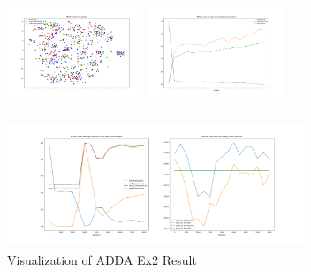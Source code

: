 \documentclass[conference]{IEEEtran}
\begin{document}
\begin{figure}[htb]

\centering
\begin{minipage}[t]{0.26\textwidth}
\includegraphics[width=1.6in, height=1.5in]{Ladda/A2R_no_dec_no_bn/ADDA_visual.png}
\end{minipage}%
\begin{minipage}[t]{0.26\textwidth}
\includegraphics[width=1.6in, height=1.5in]{Ladda/A2R_no_dec_no_bn/clf.png}
\end{minipage}%
\begin{minipage}[t]{0.45\textwidth}
\includegraphics[width=3.5in, height=1.5in]{Ladda/A2R_no_dec_no_bn/gan.png}
\end{minipage}%
\caption{Visualization of ADDA Ex2 Result}\label{fig:Ex2}
\end{figure}
\end{document}

